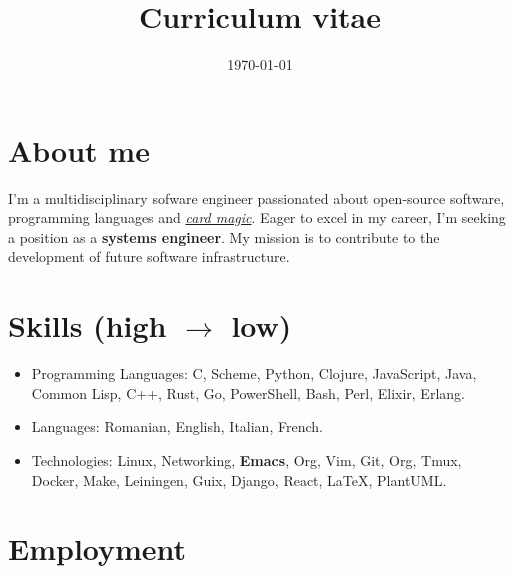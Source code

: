 \documentclass{moderncv}
\date{\today}
\title{Curriculum vitae}
\begin{document}
\maketitle

\section{About me}
\label{sec:orgf4175f5}
I'm a multidisciplinary sofware engineer passionated 
about open-source software, programming languages 
and \href{https://www.youtube.com/watch?v=S9T6VeXbfkQ}{\emph{card magic}}. Eager to excel in my career, 
I'm seeking a position as a \textbf{systems engineer}. 
My mission is to contribute to the development 
of future software infrastructure.

\section{Skills (high \(\rightarrow\) low)}
\label{sec:org152c6e6}
\begin{itemize}
\item Programming Languages: C, Scheme, Python, Clojure, 
JavaScript, Java, Common Lisp, C++, Rust, Go, 
PowerShell, Bash, Perl, Elixir, Erlang.
\item Languages: Romanian, English, Italian, French.
\item Technologies: Linux, Networking, \textbf{Emacs}, Org, Vim, 
Git, Org, Tmux, Docker, Make, Leiningen, Guix,  
Django, React, \LaTeX{}, PlantUML.
\end{itemize}
\section{Employment}
\label{sec:org4fab6e9}
\end{document}
